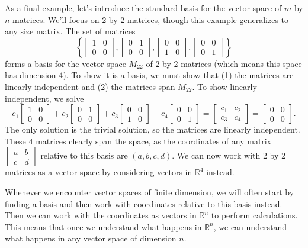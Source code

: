 \begin{example}
As a final example, let's introduce the standard basis for the vector space of $m$ by $n$ matrices. We'll focus on 2 by 2 matrices, though this example generalizes to any size matrix. The set of matrices 
$$\left\{
\begin{bmatrix}
 1 & 0  \\
 0 & 0 
\end{bmatrix},
\begin{bmatrix}
 0 & 1  \\
 0 & 0 
\end{bmatrix},
\begin{bmatrix}
 0 & 0  \\
 1 & 0 
\end{bmatrix},
\begin{bmatrix}
 0 & 0  \\
 0 & 1 
\end{bmatrix}
\right\}$$
forms a basis for the vector space $M_{22}$ of 2 by 2 matrices (which means this space has dimension 4).  
To show it is a basis, we must show that (1) the matrices are linearly independent and (2) the matrices span $M_{22}$.
To show linearly independent, we solve 
$$c_1
\begin{bmatrix}
 1 & 0  \\
 0 & 0 
\end{bmatrix}
+c_2
\begin{bmatrix}
 0 & 1  \\
 0 & 0 
\end{bmatrix}
+c_3
\begin{bmatrix}
 0 & 0  \\
 1 & 0 
\end{bmatrix}
+c_4
\begin{bmatrix}
 0 & 0  \\
 0 & 1 
\end{bmatrix}
=
\begin{bmatrix}
 c_1 & c_2  \\
 c_3 & c_4 
\end{bmatrix}
=\begin{bmatrix}
 0 & 0  \\
 0 & 0 
\end{bmatrix}
.$$
The only solution is the trivial solution, so the matrices are linearly independent. 
These 4 matrices clearly span the space, as the coordinates of any matrix 
$\begin{bmatrix}
 a & b  \\
 c & d 
\end{bmatrix}$ 
relative to this basis are $(a,b,c,d)$.
We can now work with 2 by 2 matrices as a vector space by considering vectors in ${\mathbb{R}}^4$ instead. 
\end{example}

Whenever we encounter vector spaces of finite dimension, we will often start by finding a basis and then work with coordinates relative to this basis instead. Then we can work with the coordinates as vectors in ${\mathbb{R}}^n$ to perform calculations. This means that once we understand what happens in ${\mathbb{R}}^n$, we can understand what happens in any vector space of dimension $n$. 


